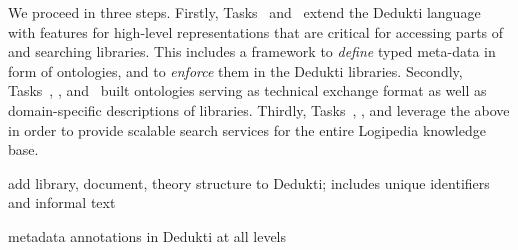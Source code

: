 \begin{workpackage}[id=structuring,wphases=0-48,type=RTD,
  short=Structured Theories and Metadata,%
  title=Structured Theories and Metadata,
  lead=Fau,
  BolRM=6,
  TumRM=6,
  FauRM=48,
  SacRM=48]
\begin{wpdescription}
We proceed in three steps.
Firstly, Tasks~ and~ extend the Dedukti language with features for high-level representations that are critical for accessing parts of and searching libraries.
This includes a framework to \emph{define} typed meta-data in form of ontologies, and to \emph{enforce} them in 
the Dedukti libraries.
Secondly, Tasks~, , and~ built ontologies serving as technical exchange format as well as domain-specific descriptions of libraries.
Thirdly, Tasks~, , and  leverage the above in order to provide scalable search services for the entire Logipedia knowledge base.
\end{wpdescription}

\begin{tasklist}
\begin{task}[id=strlibstructure,title=Library Structure,lead=Fau,FauRM=18]
add library, document, theory structure to Dedukti; includes unique identifiers and informal text

%
%
\end{task} 

\begin{task}[id=strdofimpl,title=Ontological Framework for Meta-Data,lead=Sac,SacRM=18]
metadata annotations in Dedukti at all levels
\end{task} 


\end{tasklist}
\end{workpackage}
